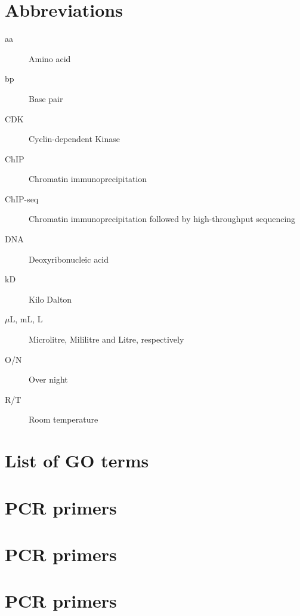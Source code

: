 \documentclass[11pt,twoside,a4paper]{report}
\begin{document}
\cleardoublepage
%
%




\cleardoublepage
\begin{appendices}
	\chapter{Abbreviations}
		\begin{description}
			\item[aa] Amino acid
			\item[bp] Base pair
			\item[CDK] Cyclin-dependent Kinase
			\item[ChIP] Chromatin immunoprecipitation
			\item[ChIP-seq] Chromatin immunoprecipitation followed by high-throughput sequencing
			\item[DNA] Deoxyribonucleic acid
			\item[kD] Kilo Dalton
			\item[$\mu$L, mL, L] Microlitre, Mililitre and Litre, respectively
			\item[O/N] Over night
			\item[R/T] Room temperature
		\end{description}

	\chapter{List of GO terms}
	\chapter{PCR primers}
	\chapter{PCR primers}
	\chapter{PCR primers}
\end{appendices}
\end{document}
